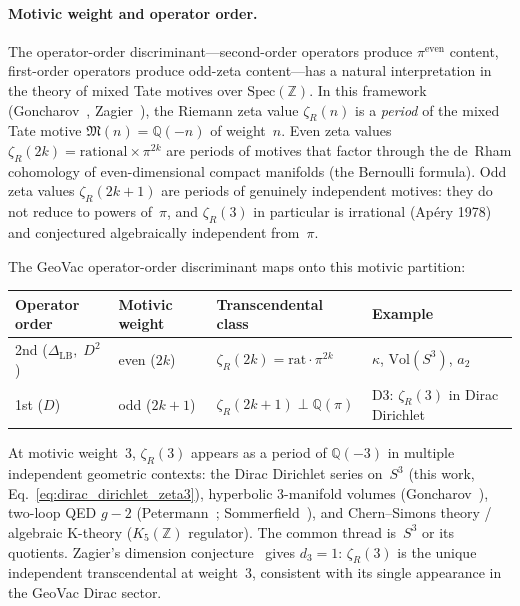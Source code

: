 \documentclass[aps,pra,twocolumn,superscriptaddress,longbibliography]{revtex4-2}
\begin{document}
\paragraph{Motivic weight and operator order.}
The operator-order discriminant---second-order operators produce
$\pi^{\text{even}}$ content, first-order operators produce odd-zeta
content---has a natural interpretation in the theory of mixed Tate
motives over $\mathrm{Spec}(\mathbb{Z})$.  In this framework
(Goncharov~\cite{goncharov1999}, Zagier~\cite{zagier1994}), the Riemann
zeta value $\zeta_R(n)$ is a \emph{period} of the mixed Tate motive
$\mathfrak{M}(n) = \mathbb{Q}(-n)$ of weight~$n$.  Even zeta values
$\zeta_R(2k) = \text{rational} \times \pi^{2k}$ are periods of motives
that factor through the de~Rham cohomology of even-dimensional compact
manifolds (the Bernoulli formula).  Odd zeta values $\zeta_R(2k{+}1)$
are periods of genuinely independent motives: they do not reduce to
powers of~$\pi$, and $\zeta_R(3)$ in particular is irrational (Ap\'ery
1978) and conjectured algebraically independent from~$\pi$.

The GeoVac operator-order discriminant maps onto this motivic
partition:
\begin{center}
\begin{tabular}{llll}
  \hline
  Operator order & Motivic weight & Transcendental class & Example \\
  \hline
  2nd ($\Delta_{\text{LB}},\; D^2$)
    & even ($2k$) & $\zeta_R(2k) = \text{rat} \cdot \pi^{2k}$
    & $\kappa$, $\mathrm{Vol}(S^3)$, $a_2$ \\
  1st ($D$)
    & odd ($2k{+}1$) & $\zeta_R(2k{+}1) \perp \mathbb{Q}(\pi)$
    & D3: $\zeta_R(3)$ in Dirac Dirichlet \\
  \hline
\end{tabular}
\end{center}

At motivic weight~3, $\zeta_R(3)$ appears as a period of
$\mathbb{Q}(-3)$ in multiple independent geometric contexts:
the Dirac Dirichlet series on~$S^3$ (this work,
Eq.~\ref{eq:dirac_dirichlet_zeta3}), hyperbolic 3-manifold volumes
(Goncharov~\cite{goncharov1999}), two-loop QED $g{-}2$
(Petermann~\cite{petermann1957}; Sommerfield~\cite{sommerfield1957}),
and Chern--Simons theory / algebraic K-theory
($K_5(\mathbb{Z})$ regulator).  The common thread is~$S^3$ or its
quotients.  Zagier's dimension conjecture~\cite{zagier1994} gives
$d_3 = 1$: $\zeta_R(3)$ is the unique independent transcendental
at weight~3, consistent with its single appearance in the GeoVac
Dirac sector.
\end{document}
